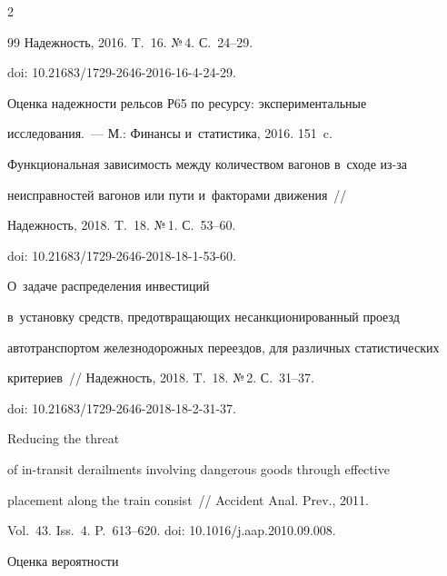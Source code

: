 \begin{multicols}{2}
{{\begin{thebibliography}{99}
Надежность, 2016. T.~16. №\,4. С.~24--29. 


doi: 10.21683/1729-2646-2016-16-4-24-29.







 Оценка надежности рельсов Р65 по ресурсу: экспериментальные 


исследования.~--- М.: Финансы и~статистика, 2016. 151~c.









Функциональная зависимость между количеством вагонов в~сходе из-за 


неисправностей вагонов или пути и~факторами движения~// 


Надежность, 2018. T.~18. №\,1. С.~53--60. 


doi: 10.21683/1729-2646-2018-18-1-53-60.







 О~задаче распределения инвестиций 


в~установку средств, предотвращающих несанкционированный проезд 


автотранспортом железнодорожных переездов, для различных статистических 


критериев~// Надежность, 2018. T.~18. №\,2. С.~31--37. 


doi: 10.21683/1729-2646-2018-18-2-31-37.







 Reducing the threat 


of in-transit derailments involving dangerous goods through effective 


placement along the train consist~// Accident Anal. Prev., 2011. 


Vol.~43. Iss.~4. P.~613--620. doi: 10.1016/j.aap.2010.09.008.







 Оценка вероятности 



\end{thebibliography}}}
\end{multicols}
